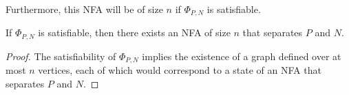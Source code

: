 Furthermore, this NFA will be of size \(n\) if
\(\Phi_{P, N}\) is satisfiable.
\begin{theorem}
  If \(\Phi_{P, N}\) is satisfiable, then there exists an NFA of size \(n\)
  that separates \(P\) and \(N\).
\end{theorem}
\begin{proof}
  The satisfiability of \(\Phi_{P, N}\) implies the existence of
  a graph defined over at most \(n\) vertices,
  each of which would correspond to a state of an NFA that separates
  \(P\) and \(N\).
\end{proof}

